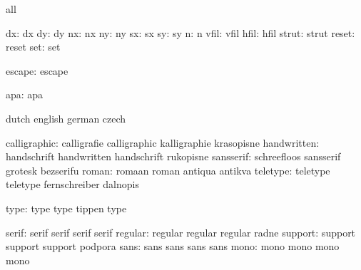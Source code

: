 \stopvariables




\startconstants       all

                 dx:  dx
                 dy:  dy
                 nx:  nx
                 ny:  ny
                 sx:  sx
                 sy:  sy
                  n:  n
               vfil:  vfil
               hfil:  hfil
              strut:  strut
              reset:  reset
                set:  set

             escape:  escape

                apa:  apa

\stopconstants




\startvariables       dutch                english             german
                      czech

       calligraphic:  calligrafie          calligraphic        kalligraphie
                      krasopisne
        handwritten:  handschrift          handwritten         handschrift
                      rukopisne
          sansserif:  schreefloos          sansserif           grotesk
                      bezserifu
              roman:  romaan               roman               antiqua
                      antikva
           teletype:  teletype             teletype            fernschreiber
                      dalnopis

               type:  type                 type                tippen
                      type

              serif:  serif                serif               serif
                      serif
            regular:  regular              regular             regular
                      radne
            support:  support              support             support
                      podpora
               sans:  sans                 sans                sans
                      sans
               mono:  mono                 mono                mono
                      mono

\stopvariables

